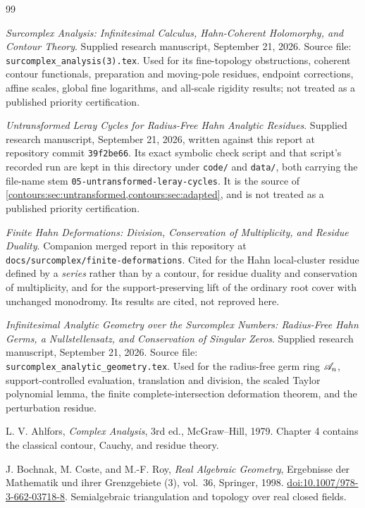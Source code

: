 \documentclass[11pt,letterpaper]{article}
\theoremstyle{definition}
\theoremstyle{remark}
\numberwithin{equation}{section}
\begin{document}
\begin{thebibliography}{99}

\emph{Surcomplex Analysis: Infinitesimal Calculus, Hahn-Coherent Holomorphy, and
Contour Theory}. Supplied research manuscript, September 21, 2026. Source file:
\texttt{surcomplex\_analysis(3).tex}. Used for its fine-topology obstructions,
coherent contour functionals, preparation and moving-pole residues, endpoint
corrections, affine scales, global fine logarithms, and all-scale rigidity results;
not treated as a published priority certification.

\emph{Untransformed Leray Cycles for Radius-Free Hahn Analytic Residues}.
Supplied research manuscript, September 21, 2026, written against this report at
repository commit \texttt{39f2be66}. Its exact symbolic check script and that
script's recorded run are kept in this directory under \texttt{code/} and
\texttt{data/}, both carrying the file-name stem
\texttt{05-untransformed-\allowbreak leray-\allowbreak cycles}.
It is the source of
\cref{contours:sec:untransformed,contours:sec:adapted}, and is not treated as a
published priority certification.

\emph{Finite Hahn Deformations: Division, Conservation of Multiplicity, and
Residue Duality}. Companion merged report in this repository at
\texttt{docs/surcomplex/finite-deformations}. Cited for the Hahn local-cluster
residue defined by a \emph{series} rather than by a contour, for residue duality
and conservation of multiplicity, and for the support-preserving lift of the
ordinary root cover with unchanged monodromy. Its results are cited, not
reproved here.

\emph{Infinitesimal Analytic Geometry over the Surcomplex Numbers: Radius-Free Hahn
Germs, a Nullstellensatz, and Conservation of Singular Zeros}. Supplied research
manuscript, September 21, 2026. Source file:
\texttt{surcomplex\_analytic\_geometry.tex}. Used for the radius-free germ ring
$\mathscr A_n$, support-controlled evaluation, translation and division, the scaled Taylor
polynomial lemma, the finite complete-intersection deformation theorem, and the
perturbation residue.

L. V. Ahlfors, \emph{Complex Analysis}, 3rd ed., McGraw--Hill, 1979. Chapter 4
contains the classical contour, Cauchy, and residue theory.

J. Bochnak, M. Coste, and M.-F. Roy, \emph{Real Algebraic Geometry}, Ergebnisse der
Mathematik und ihrer Grenzgebiete (3), vol.~36, Springer, 1998.
\href{https://doi.org/10.1007/978-3-662-03718-8}{doi:10.1007/978-3-662-03718-8}.
Semialgebraic triangulation and topology over real closed fields.


\end{thebibliography}
\end{document}
